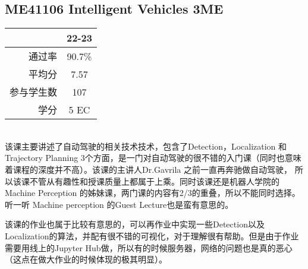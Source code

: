 \subsection{ME41106 Intelligent Vehicles 3ME}
\begin{minipage}{0.45\textwidth}
\centering
{}
\end{minipage}%
\begin{minipage}{0.45\textwidth}
\raggedleft
\begin{tabular}{r|c}
\textbf{ } & \textbf{22-23} \\ \hline
通过率 & 90.7\% \\ 
平均分 & 7.57 \\ 
参与学生数 & 107 \\ 
学分 & 5 EC\\
\end{tabular}
\end{minipage}\\

该课主要讲述了自动驾驶的相关技术技术，包含了Detection，Localization 和 Trajectory Planning 3个方面，是一门对自动驾驶的很不错的入门课（同时也意味着课程的深度并不高）。该课的主讲人Dr.Gavrila 之前一直再奔驰做自动驾驶， 所以该课不管从有趣性和授课质量上都属于上乘。同时该课还是机器人学院的Machine Perception 的姊妹课，两门课的内容有2/3的重叠，所以不能同时选择。听一听 Machine perception 的Guest Lecture也是蛮有意思的。

该课的作业也属于比较有意思的，可以再作业中实现一些Detection以及Localization的算法，并配有很不错的可视化，对于理解很有帮助。但是由于作业需要用线上的Jupyter Hub做，所以有的时候服务器，网络的问题也是真的恶心（这点在做大作业的时候体现的极其明显）。

